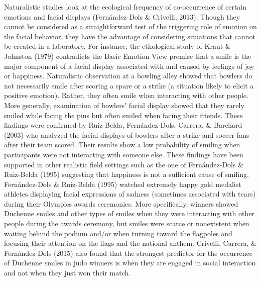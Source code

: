 \documentclass[man]{apa6}
\begin{document}
Naturalistic studies look at the ecological frequency of co-occurrence of certain emotions and facial displays (Fernández-Dols \& Crivelli, 2013). Though they cannot be considered as a straightforward test of the triggering role of emotion on the facial behavior, they have the advantage of considering situations that cannot be created in a laboratory. For instance, the ethological study of Kraut \& Johnston (1979) contradicts the Basic Emotion View premise that a smile is the major component of a facial display associated with and caused by feelings of joy or happiness. Naturalistic observation at a bowling alley showed that bowlers do not necessarily smile after scoring a spare or a strike (a situation likely to elicit a positive emotion). Rather, they often smile when interacting with other people. More generally, examination of bowlers' facial display showed that they rarely smiled while facing the pins but often smiled when facing their friends. These findings were confirmed by Ruiz-Belda, Fernández-Dols, Carrera, \& Barchard (2003) who analyzed the facial displays of bowlers after a strike and soccer fans after their team scored. Their results show a low probability of smiling when participants were not interacting with someone else. These findings have been supported in other realistic field settings such as the one of Fernández-Dols \& Ruiz-Belda (1995) suggesting that happiness is not a sufficient cause of smiling. Fernández-Dols \& Ruiz-Belda (1995) watched extremely happy gold medalist athletes displaying facial expressions of sadness (sometimes associated with tears) during their Olympics awards ceremonies. More specifically, winners showed Duchenne smiles and other types of smiles when they were interacting with other people during the awards ceremony, but smiles were scarce or nonexistent when waiting behind the podium and/or when turning toward the flagpoles and focusing their attention on the flags and the national anthem. Crivelli, Carrera, \& Fernández-Dols (2015) also found that the strongest predictor for the occurrence of Duchenne smiles in judo winners is when they are engaged in social interaction and not when they just won their match.
\end{document}
